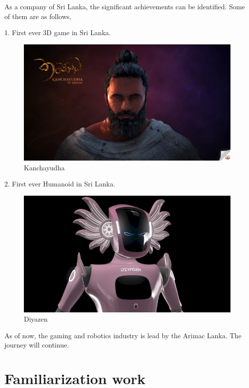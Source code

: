 \documentclass[twoside,12pt,times,onecolumn,a4paper]{report}
\begin{document}
As a company of Sri Lanka, the significant achievements can be identified. Some of them are as follows,

1. First ever 3D game in Sri Lanka.
\begin{figure}[H]
  \centering
   \includegraphics[width=12cm]{game}
  \caption{Kanchayudha}
\end{figure}

2. First ever Humanoid  in Sri Lanka.
\begin{figure}[H]
  \centering
   \includegraphics[width=12cm]{robot}
  \caption{Diyazen}
\end{figure}

As of now, the gaming and robotics industry is lead by the Arimac Lanka. The journey will continue. 

\chapter{Familiarization work}
\end{document}
